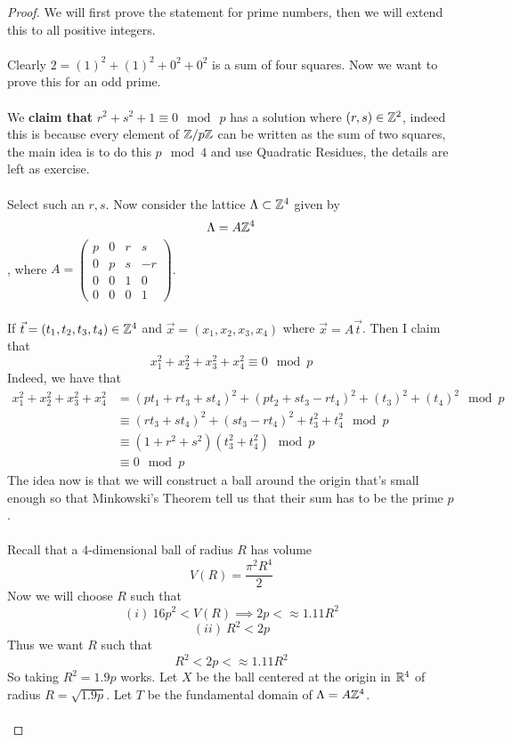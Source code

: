 \begin{proof}
We will first prove the statement for prime numbers, then we will extend this to all positive integers.\\\\
Clearly $2 = (1)^2 + (1)^2 + 0^2 + 0^2$ is a sum of four squares. Now we want to prove this for an odd prime.\\\\
We {\bf claim that} $r^2 + s^2 + 1 \equiv 0\mod\ p$ has a solution where $(r, s) \in \mathbb{Z}^2$, indeed this is because every element of $\mathbb{Z}/p\mathbb{Z}$ can be written as the sum of two squares, the main idea is to do this $p \mod 4$ and use Quadratic Residues, the details are left as exercise.\\\\
Select such an $r, s$. Now consider the lattice $\Lambda \subset \mathbb{Z}^4$ given by
\[\Lambda = A \mathbb{Z}^4\]
, where $A = \begin{pmatrix} p & 0 & r & s\\
0 & p & s & -r\\
0 & 0 & 1 & 0\\
0 & 0 & 0 & 1
\end{pmatrix}$.\\\\
If $\Vec{t} = (t_1, t_2, t_3, t_4) \in \mathbb{Z}^4$ and $\Vec{x} = (x_1, x_2, x_3, x_4)$ where $\Vec{x} = A \Vec{t}$. Then I claim that
\[x_1^2 + x_2^2 + x_3^2 + x_4^2 \equiv 0 \mod p\]
Indeed, we have that
\begin{align*}
    x_1^2 + x_2^2 + x_3^2 + x_4^2 &= (pt_1 + rt_3 + st_4)^2 + (pt_2 + st_3 - rt_4)^2 + (t_3)^2 + (t_4)^2 \mod p\\
    &\equiv (rt_3 + st_4)^2 + (st_3 - rt_4)^2 + t_3^2 + t_4^2 \mod p\\
    &\equiv (1 + r^2 + s^2)(t_3^2 + t_4^2) \mod p \tag*{Try to Compare Coefficients}\\
    &\equiv 0 \mod p \tag*{Since $1 + r^2 + s^3 \equiv 0 \mod p$}
\end{align*}
The idea now is that we will construct a ball around the origin that's small enough so that Minkowski's Theorem tell us that their sum has to be the prime $p$.\\\\
Recall that a $4$-dimensional ball of radius $R$ has volume
\[V(R) = \frac{\pi^2 R^4}{2}\]
Now we will choose $R$ such that
\[(i)\ 16p^2 < V(R) \implies 2p < \approx 1.11 R^2\]
\[(ii)\ R^2 < 2p\]
Thus we want $R$ such that
\[R^2 < 2p < \approx 1.11 R^2\]
So taking $R^2 = 1.9 p$ works. Let $X$ be the ball centered at the origin in $\mathbb{R}^4$ of radius $R = \sqrt{1.9 p}$. Let $T$ be the fundamental domain of $\Lambda = A\mathbb{Z}^4$.\\\\

\end{proof}
